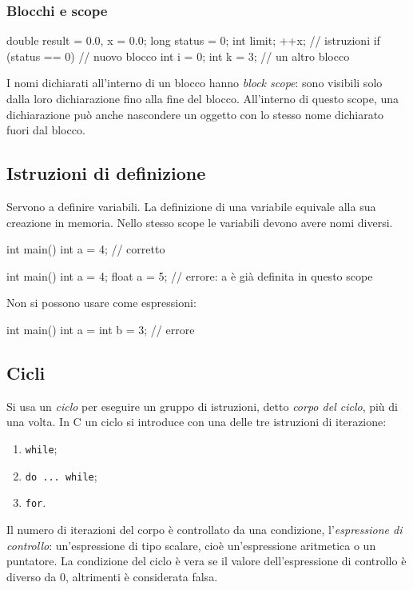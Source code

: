\documentclass[11pt,a4paper]{article}
\begin{document}
\subsubsection{Blocchi e scope}

\begin{codice}
{   double result = 0.0, x = 0.0;
    long status = 0;
    int limit;
    ++x;                    // istruzioni
    if (status == 0)
    {                       // nuovo blocco
        int i = 0;
        { int k = 3; }      // un altro blocco
    }
}
\end{codice}
I nomi dichiarati all'interno di un blocco hanno \emph{block scope}: sono visibili solo dalla loro dichiarazione fino alla fine del blocco. All'interno di questo scope, una dichiarazione può anche nascondere un oggetto con lo stesso nome dichiarato fuori dal blocco.

\subsection{Istruzioni di definizione}

Servono a definire variabili. La definizione di una variabile equivale alla sua creazione in memoria. Nello stesso scope le variabili devono avere nomi diversi.

\begin{codice}
int main() {
    int a = 4;      // corretto
}
\end{codice}
\begin{codice}
int main() {
    int a = 4;
    float a = 5;    // errore: a è già definita in questo scope
}
\end{codice}
Non si possono usare come espressioni:
\begin{codice}
int main() {
    int a = int b = 3;    // errore
}
\end{codice}

\subsection{Cicli}

Si usa un \emph{ciclo} per eseguire un gruppo di istruzioni, detto \emph{corpo del ciclo}, più di una volta. In C un ciclo si introduce con una delle tre istruzioni di iterazione:
\begin{enumerate}
    \item \lstinline|while|;
    \item \lstinline|do ... while|;
    \item \lstinline|for|.
\end{enumerate}
Il numero di iterazioni del corpo è controllato da una condizione, l'\emph{espressione di controllo}: un'espressione di tipo scalare, cioè un'espressione aritmetica o un puntatore. La condizione del ciclo è vera se il valore dell'espressione di controllo è diverso da $0$, altrimenti è considerata falsa.
\end{document}
